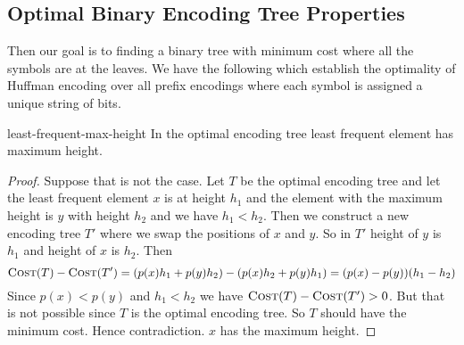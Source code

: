 \subsection{Optimal Binary Encoding Tree Properties}
Then our goal is to finding a binary tree with minimum cost where all the symbols are at the leaves. We have the following which establish the optimality of Huffman encoding over all prefix encodings where each symbol is assigned a unique string of bits.
\begin{lemma}{}{least-frequent-max-height}
	In the optimal encoding tree  least frequent element has maximum height.
\end{lemma}
\begin{proof}
	Suppose that is not the case. Let $T$ be the optimal encoding tree and let the least frequent element $x$ is at height $h_1$ and the element with the maximum height is $y$ with height $h_2$ and we have $h_1<h_2$.  Then we construct a new encoding tree $T'$ where we swap the positions of $x$ and $y$. So in $T'$ height of $y$ is $h_1$ and height of $x$ is $h_2$. Then $$\textsc{Cost}(T)-\textsc{Cost}(T')=(p(x)h_1+p(y)h_2)-(p(x)h_2+p(y)h_1)=(p(x)-p(y))(h_1-h_2)$$Since $p(x)<p(y)$ and $h_1<h_2$ we have $\textsc{Cost}(T)-\textsc{Cost}(T')>0$. But that is not possible since $T$ is the optimal encoding tree. So $T$ should have the minimum cost. Hence contradiction. $x$ has the maximum height.
\end{proof}

